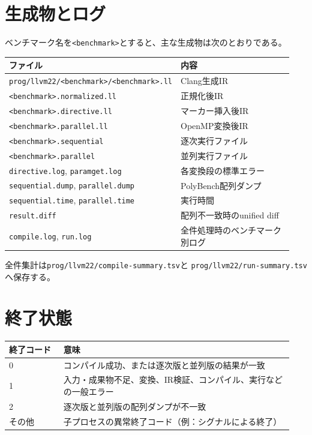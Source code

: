 \documentclass[a4paper,11pt]{ltjsarticle}
\begin{document}
\section{生成物とログ}
ベンチマーク名を\texttt{<benchmark>}とすると、主な生成物は次のとおりである。
\begin{longtable}{p{0.54\linewidth}p{0.40\linewidth}}
\toprule
ファイル & 内容 \\
\midrule
\endhead
\texttt{prog/llvm22/<benchmark>/<benchmark>.ll} & Clang生成IR \\
\texttt{<benchmark>.normalized.ll} & 正規化後IR \\
\texttt{<benchmark>.directive.ll} & マーカー挿入後IR \\
\texttt{<benchmark>.parallel.ll} & OpenMP変換後IR \\
\texttt{<benchmark>.sequential} & 逐次実行ファイル \\
\texttt{<benchmark>.parallel} & 並列実行ファイル \\
\texttt{directive.log}, \texttt{paramget.log} & 各変換段の標準エラー \\
\texttt{sequential.dump}, \texttt{parallel.dump} & PolyBench配列ダンプ \\
\texttt{sequential.time}, \texttt{parallel.time} & 実行時間 \\
\texttt{result.diff} & 配列不一致時のunified diff \\
\texttt{compile.log}, \texttt{run.log} & 全件処理時のベンチマーク別ログ \\
\bottomrule
\end{longtable}

全件集計は\texttt{prog/llvm22/compile-summary.tsv}と
\texttt{prog/llvm22/run-summary.tsv}へ保存する。

\section{終了状態}
\begin{longtable}{p{0.18\linewidth}p{0.76\linewidth}}
\toprule
終了コード & 意味 \\
\midrule
\endhead
0 & コンパイル成功、または逐次版と並列版の結果が一致 \\
1 & 入力・成果物不足、変換、IR検証、コンパイル、実行などの一般エラー \\
2 & 逐次版と並列版の配列ダンプが不一致 \\
その他 & 子プロセスの異常終了コード（例：シグナルによる終了） \\
\bottomrule
\end{longtable}
\end{document}
